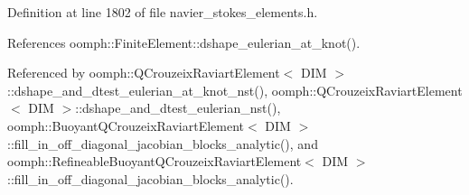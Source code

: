 Definition at line 1802 of file navier\+\_\+stokes\+\_\+elements.\+h.



References oomph\+::\+Finite\+Element\+::dshape\+\_\+eulerian\+\_\+at\+\_\+knot().



Referenced by oomph\+::\+Q\+Crouzeix\+Raviart\+Element$<$ D\+I\+M $>$\+::dshape\+\_\+and\+\_\+dtest\+\_\+eulerian\+\_\+at\+\_\+knot\+\_\+nst(), oomph\+::\+Q\+Crouzeix\+Raviart\+Element$<$ D\+I\+M $>$\+::dshape\+\_\+and\+\_\+dtest\+\_\+eulerian\+\_\+nst(), oomph\+::\+Buoyant\+Q\+Crouzeix\+Raviart\+Element$<$ D\+I\+M $>$\+::fill\+\_\+in\+\_\+off\+\_\+diagonal\+\_\+jacobian\+\_\+blocks\+\_\+analytic(), and oomph\+::\+Refineable\+Buoyant\+Q\+Crouzeix\+Raviart\+Element$<$ D\+I\+M $>$\+::fill\+\_\+in\+\_\+off\+\_\+diagonal\+\_\+jacobian\+\_\+blocks\+\_\+analytic().

\mbox{\label{classoomph_1_1QCrouzeixRaviartElement_a9f923e381bfe374b75238c2798eb4834}} 
